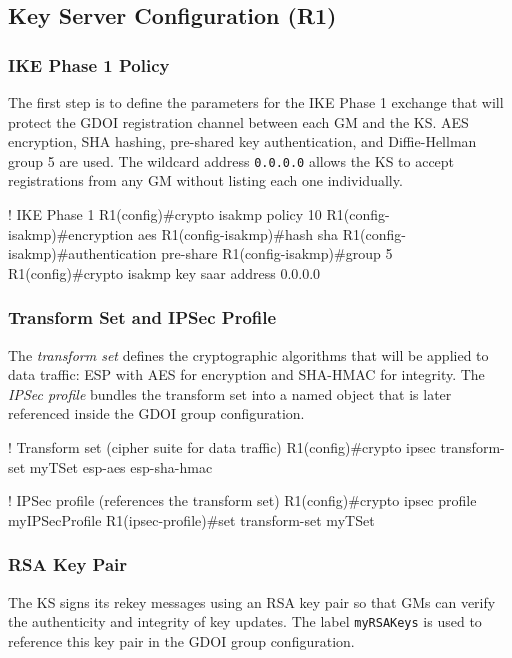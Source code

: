 \documentclass[12pt]{article}
\begin{document}
\subsection{Key Server Configuration (R1)}

\subsubsection{IKE Phase 1 Policy}

The first step is to define the parameters for the IKE Phase 1 exchange that will protect the GDOI registration channel between each GM and the KS. AES encryption, SHA hashing, pre-shared key authentication, and Diffie-Hellman group 5 are used. The wildcard address \texttt{0.0.0.0} allows the KS to accept registrations from any GM without listing each one individually.

\begin{configbox}
! IKE Phase 1
R1(config)#crypto isakmp policy 10
R1(config-isakmp)#encryption aes
R1(config-isakmp)#hash sha
R1(config-isakmp)#authentication pre-share
R1(config-isakmp)#group 5
R1(config)#crypto isakmp key saar address 0.0.0.0
\end{configbox}

\subsubsection{Transform Set and IPSec Profile}

The \textit{transform set} defines the cryptographic algorithms that will be applied to data traffic: ESP with AES for encryption and SHA-HMAC for integrity. The \textit{IPSec profile} bundles the transform set into a named object that is later referenced inside the GDOI group configuration.

\begin{configbox}
! Transform set (cipher suite for data traffic)
R1(config)#crypto ipsec transform-set myTSet esp-aes esp-sha-hmac

! IPSec profile (references the transform set)
R1(config)#crypto ipsec profile myIPSecProfile
R1(ipsec-profile)#set transform-set myTSet
\end{configbox}

\subsubsection{RSA Key Pair}

The KS signs its rekey messages using an RSA key pair so that GMs can verify the authenticity and integrity of key updates. The label \texttt{myRSAKeys} is used to reference this key pair in the GDOI group configuration.
\end{document}
